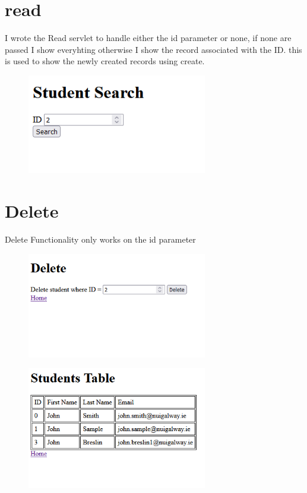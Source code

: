 \documentclass{article}
\begin{document}
	\section{read}
		I wrote the Read servlet to handle either the id parameter or none, if none are passed I show everyhting otherwise I show the record associated with the ID. this is used to show the newly created records using create.
		\begin{figure}[h!]
			\centering
			\includegraphics[width=0.7\textwidth]{5.png}
		\end{figure}
		\newpage
		
	\section{Delete}
		Delete Functionality only works on the id parameter
		
		\begin{figure}[h!]
			\centering
			\includegraphics[width=0.7\textwidth]{6.png}
		\end{figure}
		
		\begin{figure}[h!]
			\centering
			\includegraphics[width=0.7\textwidth]{7.png}
		\end{figure}
\end{document}
